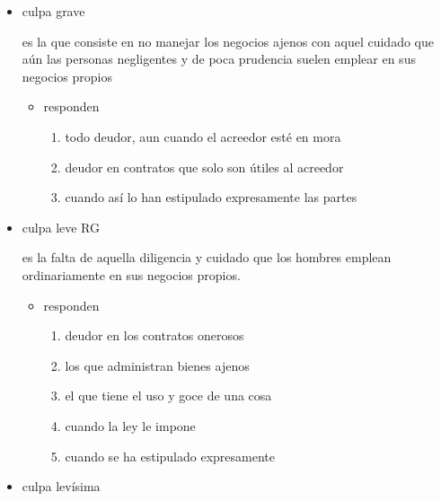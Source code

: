 \documentclass[]{article}
\providecommand{\tightlist}{%
  \setlength{\itemsep}{0pt}\setlength{\parskip}{0pt}}
\begin{document}
\begin{itemize}
\begin{itemize}
\begin{itemize}
\begin{itemize}
\begin{itemize}
\begin{itemize}
            \begin{itemize}
            \item
              culpa grave

              es la que consiste en no manejar los negocios ajenos con
              aquel cuidado que aún las personas negligentes y de poca
              prudencia suelen emplear en sus negocios propios

              \begin{itemize}
              \tightlist
              \item
                responden

                \begin{enumerate}
                \def\labelenumi{\arabic{enumi}.}
                \tightlist
                \item
                  todo deudor, aun cuando el acreedor esté en mora
                \item
                  deudor en contratos que solo son útiles al acreedor
                \item
                  cuando así lo han estipulado expresamente las partes
                \end{enumerate}
              \end{itemize}
            \item
              culpa leve RG

              es la falta de aquella diligencia y cuidado que los
              hombres emplean ordinariamente en sus negocios propios.

              \begin{itemize}
              \tightlist
              \item
                responden

                \begin{enumerate}
                \def\labelenumi{\arabic{enumi}.}
                \tightlist
                \item
                  deudor en los contratos onerosos
                \item
                  los que administran bienes ajenos
                \item
                  el que tiene el uso y goce de una cosa
                \item
                  cuando la ley le impone
                \item
                  cuando se ha estipulado expresamente
                \end{enumerate}
              \end{itemize}
            \item
              culpa levísima


\end{itemize}
\end{itemize}
\end{itemize}
\end{itemize}
\end{itemize}
\end{itemize}
\end{itemize}
\end{document}
